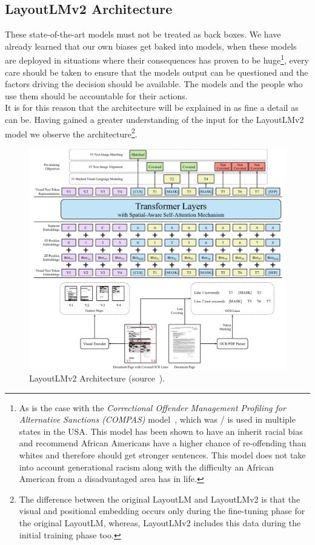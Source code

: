 \subsection{LayoutLMv2 Architecture}
These state-of-the-art models must not be treated as back boxes. We have already learned that our own biases get baked into models, when these models
are deployed in situations where their consequences has proven to be huge\footnote{As is the case with the \emph{Correctional Offender Management
		Profiling for Alternative Sanctions (COMPAS)} model~\autocite{rahmanCOMPASCaseStudy2020}, which was / is used in multiple states in the USA.
	This model has been shown to have an inherit racial bias and recommend African Americans have a higher chance of re-offending than whites and
	therefore should get stronger sentences.
	This model does not take into account generational racism along with the difficulty an African American from a disadvantaged area has in life.}, every care
should be taken to ensure that the models output can be questioned and the factors driving the decision should be available. The models and the
people who use them should be accountable for their actions.\\
It is for this reason that the architecture will be explained in as fine a detail as can be.
\bigbreak
Having gained a greater understanding of the input for the LayoutLMv2 model we observe the architecture\footnote{The difference between the original LayoutLM and LayoutLMv2
	is that the visual and positional embedding occurs only during the fine-tuning phase for the original LayoutLM, whereas, LayoutLMv2 includes this
	data during the initial training phase too.}.
\begin{figure}[H]
	\centering
	\includegraphics[width=1\textwidth]{figures/layoutlmv2_archi.png}
	\caption{LayoutLMv2 Architecture (source~\autocite{xuLayoutLMv2MultimodalPretraining2022}).}
	\label{fig:layoutlmv2_archi}
\end{figure}

